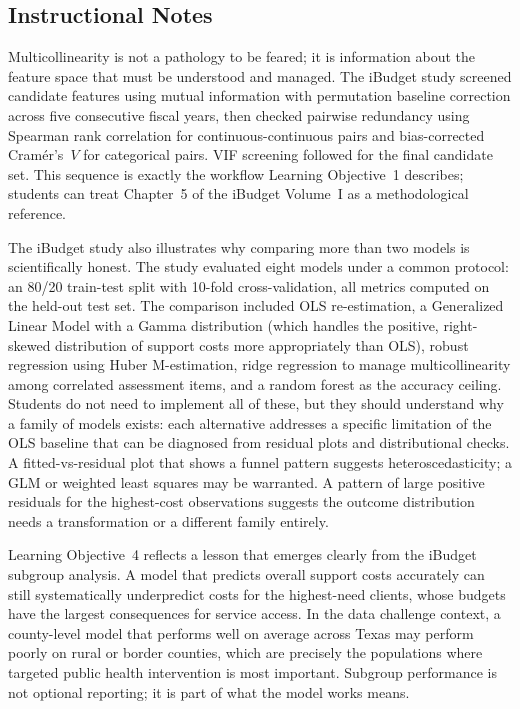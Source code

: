 \subsection{Instructional Notes}

Multicollinearity is not a pathology to be feared; it is information
about the feature space that must be understood and managed. The
iBudget study screened candidate features using mutual information
with permutation baseline correction across five consecutive fiscal
years, then checked pairwise redundancy using Spearman rank
correlation for continuous-continuous pairs and bias-corrected
Cram\'er's~$V$ for categorical pairs. VIF screening followed for
the final candidate set. This sequence is exactly the workflow
Learning Objective~1 describes; students can treat Chapter~5 of
the iBudget Volume~I as a methodological reference.

The iBudget study also illustrates why comparing more than two
models is scientifically honest. The study evaluated eight models
under a common protocol: an 80/20 train-test split with 10-fold
cross-validation, all metrics computed on the held-out test set.
The comparison included OLS re-estimation, a Generalized Linear
Model with a Gamma distribution (which handles the positive,
right-skewed distribution of support costs more appropriately than
OLS), robust regression using Huber M-estimation, ridge regression
to manage multicollinearity among correlated assessment items, and
a random forest as the accuracy ceiling. Students do not need to
implement all of these, but they should understand why a family
of models exists: each alternative addresses a specific limitation
of the OLS baseline that can be diagnosed from residual plots and
distributional checks. A fitted-vs-residual plot that shows a
funnel pattern suggests heteroscedasticity; a GLM or weighted least
squares may be warranted. A pattern of large positive residuals for
the highest-cost observations suggests the outcome distribution
needs a transformation or a different family entirely.

Learning Objective~4 reflects a lesson that emerges clearly from
the iBudget subgroup analysis. A model that predicts overall support
costs accurately can still systematically underpredict costs for the
highest-need clients, whose budgets have the largest consequences
for service access. In the data challenge context, a county-level
model that performs well on average across Texas may perform poorly
on rural or border counties, which are precisely the populations
where targeted public health intervention is most important. Subgroup
performance is not optional reporting; it is part of what the model
works means.

